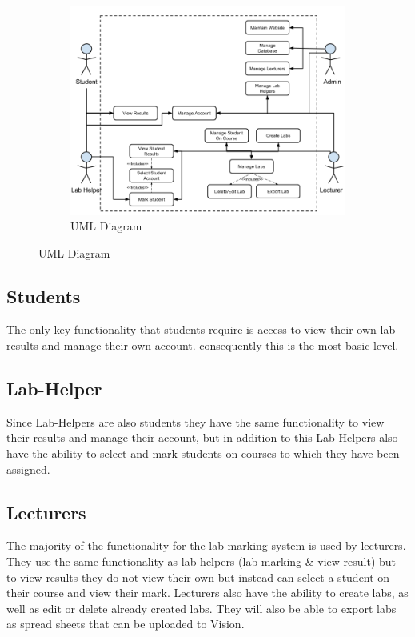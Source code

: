 \documentclass[11pt]{report}
\begin{document}
{

\newpage
\begin{figure}
\begin{figure}[H]
    \centering
    \includegraphics[width=1
    \textwidth]{images/design/Use-Case-Diagram.png}
    \caption{UML Diagram}
    \label{fig:uml}
\end{figure}
\end{figure}

\subsection*{Students}
The only key functionality that students require is access  to view their own lab results and manage their own account. consequently this is the most basic level.


\subsection*{Lab-Helper}
Since Lab-Helpers are also students they have the same functionality to view their results and manage their account, but in addition to this Lab-Helpers also have the ability to select and mark students on courses to which they have been assigned.

} 


\subsection*{Lecturers}

The majority of the functionality for the lab marking system is used by lecturers. They use the same functionality as lab-helpers (lab marking \& view result) but to view results they do not view their own but instead can select a student on their course and view their mark. Lecturers also have the ability to create labs, as well as edit or delete already created labs. They will also be able to export labs as spread sheets that can be uploaded to Vision.  
\end{document}
